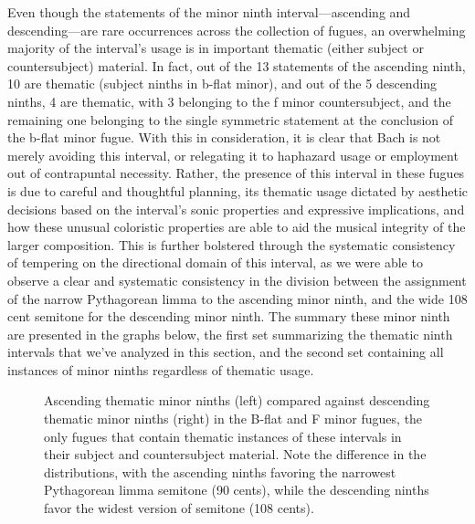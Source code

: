 Even though the statements of the minor ninth interval---ascending
and descending---are rare occurrences across the collection of
fugues, an overwhelming majority of the interval's usage is in important
thematic (either subject or countersubject) material. In fact, out of
the 13 statements of the ascending ninth, 10 are thematic (subject
ninths in b-flat minor), and out of the 5 descending ninths, 4 are
thematic, with 3 belonging to the f minor countersubject, and the
remaining one belonging to the single symmetric statement at the
conclusion of the b-flat minor fugue. With this in consideration, it is
clear that Bach is not merely avoiding this interval, or relegating it
to haphazard usage or employment out of contrapuntal necessity. Rather,
the presence of this interval in these fugues is due to careful and
thoughtful planning, its thematic usage dictated by aesthetic decisions
based on the interval's sonic properties and expressive implications,
and how these unusual coloristic properties are able to aid the musical
integrity of the larger composition. This is further bolstered through
the systematic consistency of tempering on the directional domain of
this interval, as we were able to observe a clear and systematic
consistency in the division between the assignment of the narrow
Pythagorean limma to the ascending minor ninth, and the wide 108 cent
semitone for the descending minor ninth. The summary these minor ninth
are presented in the graphs below, the first set summarizing the
thematic ninth intervals that we've analyzed in this section, and the
second set containing all instances of minor ninths regardless of
thematic usage.



\begin{figure}[H]
\vspace{1.5em}
    \centering
    \caption[Ascending thematic minor ninths compared against descending thematic minor ninths in the B-flat and F minor fugues. ]{Ascending thematic minor ninths (left) compared against descending thematic minor ninths (right) in the B-flat and F minor fugues, the only fugues that contain thematic instances of these intervals in their subject and countersubject material. Note the difference in the distributions, with the ascending ninths favoring the narrowest Pythagorean limma semitone (90 cents), while the descending ninths favor the widest version of semitone (108 cents).}
\end{figure}

